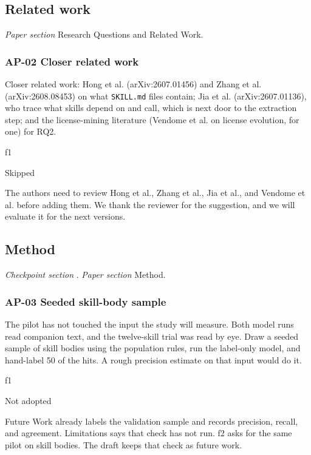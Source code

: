 \subsection*{Related work}

\textit{Paper section} Research Questions and Related Work.

\subsubsection*{AP-02 Closer related work}
\label{ap:02}

\begin{description}[leftmargin=0pt]
  \item[Point] Closer related work: Hong et al. (arXiv:2607.01456) and Zhang et al. (arXiv:2608.08453) on what \texttt{SKILL.md} files contain; Jia et al. (arXiv:2607.01136), who trace what skills depend on and call, which is next door to the extraction step; and the license-mining literature (Vendome et al. on license evolution, for one) for RQ2.
  \item[Source] f1
  \item[Decision] Skipped
  \item[Reasoning] The authors need to review Hong et al., Zhang et al., Jia et al., and Vendome et al. before adding them. We thank the reviewer for the suggestion, and we will evaluate it for the next versions.
\end{description}

\subsection*{Method}

\textit{Checkpoint section} . \textit{Paper section} Method.

\subsubsection*{AP-03 Seeded skill-body sample}
\label{ap:03}

\begin{description}[leftmargin=0pt]
  \item[Point] The pilot has not touched the input the study will measure. Both model runs read companion text, and the twelve-skill trial was read by eye. Draw a seeded sample of skill bodies using the population rules, run the label-only model, and hand-label 50 of the hits. A rough precision estimate on that input would do it.
  \item[Source] f1
  \item[Decision] Not adopted
  \item[Reasoning] Future Work already labels the validation sample and records precision, recall, and agreement. Limitations says that check has not run. f2 asks for the same pilot on skill bodies. The draft keeps that check as future work.
\end{description}

